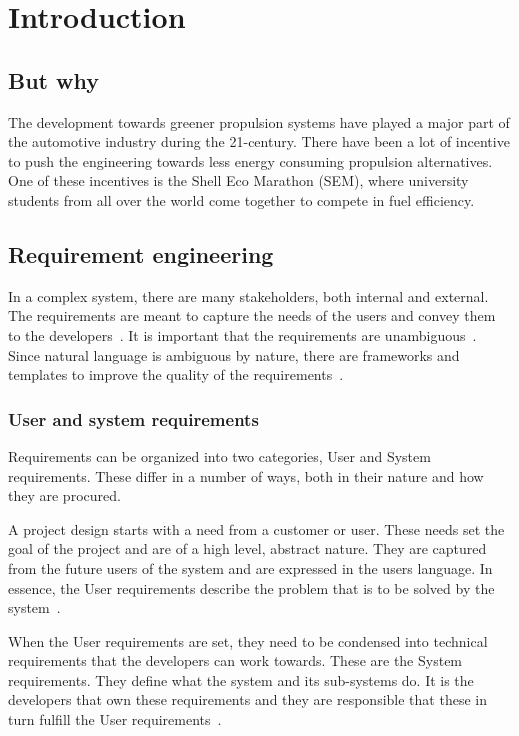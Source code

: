 \chapter{Introduction}
\section{But why}
The development towards greener propulsion systems have played a major part of the automotive industry during the 21-century. There have been a lot of incentive to push the engineering towards less energy consuming propulsion alternatives. One of these incentives is the Shell Eco Marathon (SEM), where university students from all over the world come together to compete in fuel efficiency.

\section{Requirement engineering}
In a complex system, there are many stakeholders, both internal and external.
The requirements are meant to capture the needs of the users and convey them to
the developers~\cite{ibm_req}. It is important that the requirements are
unambiguous~\cite{ibm_req, rupp2014}. Since natural language is ambiguous by
nature, there are frameworks and templates to improve the quality of the
requirements~\cite{rupp2014}. 

\subsection{User and system requirements}
Requirements can be organized into two categories, User and System requirements.
These differ in a number of ways, both in their nature and how they are
procured.

A project design starts with a need from a customer or user. These needs set the
goal of the project and are of a high level, abstract nature. They are captured
from the future users of the system and are expressed in the users language. In
essence, the User requirements describe the problem that is to be solved by the
system~\cite{ibm_req}. 

When the User requirements are set, they need to be condensed into technical
requirements that the developers can work towards. These are the System
requirements. They define what the system and its sub-systems do. It is the
developers that own these requirements and they are responsible that these in
turn fulfill the User requirements~\cite{ibm_req}.

